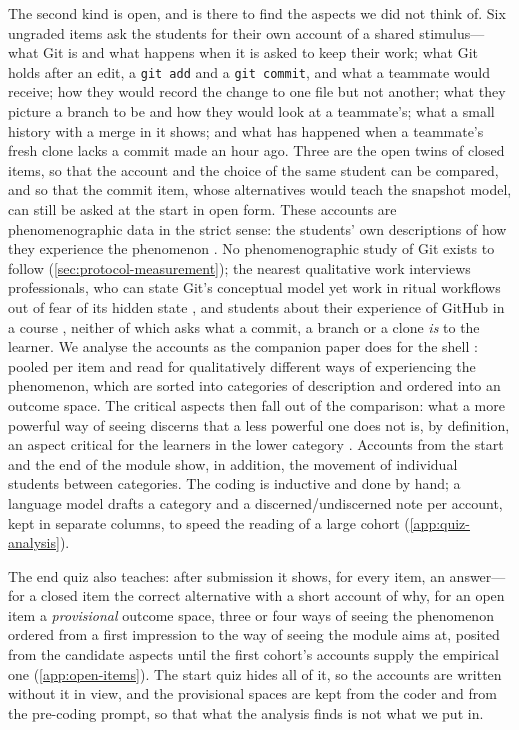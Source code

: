 The second kind is open, and is there to find the aspects we did not
think of.
Six ungraded items ask the students for their own account of a shared
stimulus---what Git is and what happens when it is asked to keep their
work; what Git holds after an edit, a \texttt{git add} and a \texttt{git commit}, and
what a teammate would receive; how they would record the change to one
file but not another; what they picture a branch to be and how they
would look at a teammate's; what a small history with a merge in it
shows; and what has happened when a teammate's fresh clone lacks a
commit made an hour ago.
Three are the open twins of closed items, so that the account and the
choice of the same student can be compared, and so that the commit
item, whose alternatives would teach the snapshot model, can still be
asked at the start in open form.
These accounts are phenomenographic data in the strict sense: the
students' own descriptions of how they experience the phenomenon
\autocite{Phenomenography}.
No phenomenographic study of Git exists to follow
(\cref{sec:protocol-measurement}); the nearest qualitative work
interviews professionals, who can state Git's conceptual model yet work
in ritual workflows out of fear of its hidden state
\autocite{Church2014HiddenDependencies}, and students about their
experience of GitHub in a course \autocite{Feliciano2016GitHubStudents},
neither of which asks what a commit, a branch or a clone \emph{is} to
the learner.
We analyse the accounts as the companion paper does for the shell
\autocite{VTTerminal}: pooled per item and read for qualitatively
different ways of experiencing the phenomenon, which are sorted into
categories of description and ordered into an outcome space.
The critical aspects then fall out of the comparison: what a more
powerful way of seeing discerns that a less powerful one does not is,
by definition, an aspect critical for the learners in the lower category
\autocite[Ch.~2]{NCOL}.
Accounts from the start and the end of the module show, in addition,
the movement of individual students between categories.
The coding is inductive and done by hand; a language model drafts a
category and a discerned/undiscerned note per account, kept in separate
columns, to speed the reading of a large cohort (\cref{app:quiz-analysis}).

The end quiz also teaches: after submission it shows, for every item, an
answer---for a closed item the correct alternative with a short account
of why, for an open item a \emph{provisional} outcome space, three or
four ways of seeing the phenomenon ordered from a first impression to
the way of seeing the module aims at, posited from the candidate aspects
until the first cohort's accounts supply the empirical one
(\cref{app:open-items}).
The start quiz hides all of it, so the accounts are written without it
in view, and the provisional spaces are kept from the coder and from the
pre-coding prompt, so that what the analysis finds is not what we put
in.

